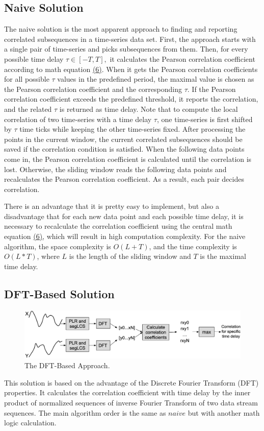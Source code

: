 \subsection{Naive Solution}
The naive solution is the most apparent approach to finding and reporting correlated subsequences in a time-series data set. First, the approach starts with a single pair of time-series and picks subsequences from them. Then, for every possible time delay $\tau \in[-T, T],$ it calculates the Pearson correlation coefficient according to math equation \hyperref[equ:6]{(6)}. When it gets the Pearson correlation coefficients for all possible $\tau$ values in the predefined period, the maximal value is chosen as the Pearson correlation coefficient and the corresponding $\tau$. If the Pearson correlation coefficient exceeds the predefined threshold, it reports the correlation, and the related $\tau$ is returned as time delay. Note that to compute the local correlation of two time-series with a time delay $\tau$, one time-series is first shifted by $\tau$ time ticks while keeping the other time-series fixed. After processing the points in the current window, the current correlated subsequences should be saved if the correlation condition is satisfied. When the following data points come in, the Pearson correlation coefficient is calculated until the correlation is lost. Otherwise, the sliding window reads the following data points and recalculates the Pearson correlation coefficient. As a result, each pair decides correlation.\newline 

There is an advantage that it is pretty easy to implement, but also a disadvantage that for each new data point and each possible time delay, it is necessary to recalculate the correlation coefficient using the central math equation \hyperref[equ:6]{(6)}, which will result in high computation complexity. For the naive algorithm, the space complexity is $O(L + T)$, and the time complexity is $O(L * T)$, where $L$ is the length of the sliding window and $T$ is the maximal time delay.

\subsection{DFT-Based Solution~\cite{ref5}}
\begin{figure}[hb]
\centering
    \includegraphics[width=\textwidth]{figures/dft.png}
    \caption{The DFT-Based Approach.}
    \label{fig:DFT}
\end{figure}
This solution is based on the advantage of the Discrete Fourier Transform (DFT) properties. It calculates the correlation coefficient with time delay by the inner product of normalized sequences of inverse Fourier Transform of two data stream sequences. The main algorithm order is the same as $naive$ but with another math logic calculation.\newline 

